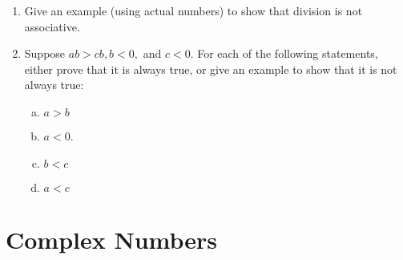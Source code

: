 \begin{enumerate}[(1)]


\item
Give an example (using actual numbers) to show that division is not associative.
\item
Suppose $ab>cb, b < 0,$ and $c<0$.  For each of the following statements, either prove that it is always true, or give an example to show that
it is not always true:
\begin{enumerate}[(a)]
\item
$a > b$ \qquad 
\item
$a < 0$.
\item
$b < c$ \qquad 
\item
$a < c$ \qquad 
\end{enumerate}

\end{enumerate}

\section{Complex Numbers}

